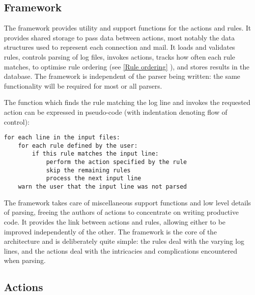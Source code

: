\documentclass[draft]{svmult}
\newcommand{\sectionref}[1]{%
    \textsection{}\vref*{#1}%
}
\begin{document}
\subsection{Framework}

\label{Framework}

The framework provides utility and support functions for the actions and
rules.  It provides shared storage to pass data between actions, most
notably the data structures used to represent each connection and mail.  It
loads and validates rules, controls parsing of log files, invokes actions,
tracks how often each rule matches, to optimise rule ordering (see
\sectionref{Rule ordering}), and stores results in the database.  The
framework is independent of the parser being written: the same
functionality will be required for most or all parsers.

The function which finds the rule matching the log line and invokes the
requested action can be expressed in pseudo-code (with indentation denoting
flow of control):


\begin{verbatim}
for each line in the input files: 
    for each rule defined by the user: 
        if this rule matches the input line:
            perform the action specified by the rule
            skip the remaining rules
            process the next input line
    warn the user that the input line was not parsed
\end{verbatim}

The framework takes care of miscellaneous support functions and low level
details of parsing, freeing the authors of actions to concentrate on
writing productive code.  It provides the link between actions and rules,
allowing either to be improved independently of the other.  The framework
is the core of the architecture and is deliberately quite simple: the rules
deal with the varying log lines, and the actions deal with the intricacies
and complications encountered when parsing.

\subsection{Actions}

\label{Actions}
\end{document}
